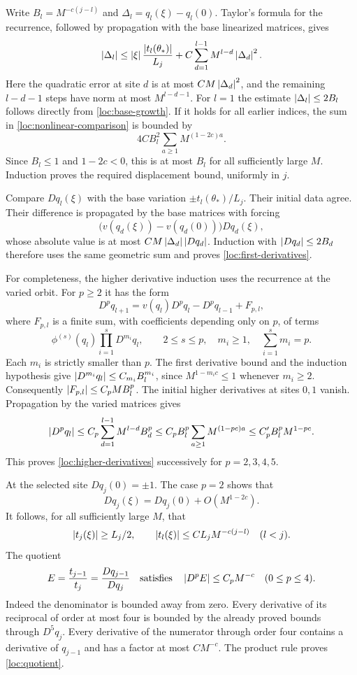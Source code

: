 Write $B_l=M^{-c(j-l)}$ and $\Delta_l=q_l(\xi)-q_l(0)$.
Taylor's formula for the recurrence, followed by propagation with the
base linearized matrices, gives
\begin{equation}
 \left\lvert\Delta_l\right\rvert
 \le \left\lvert\xi\right\rvert\frac{\left\lvert t_l(\theta_*)\right\rvert}{L_j}
       +C\sum_{d=1}^{l-1}M^{l-d}\left\lvert\Delta_d\right\rvert^2.
 \label{loc:nonlinear-comparison}
\end{equation}
Here the quadratic error at site $d$ is at most $CM\left\lvert\Delta_d\right\rvert^2$,
and the remaining $l-d-1$ steps have norm at most $M^{l-d-1}$.
For $l=1$ the estimate $\left\lvert\Delta_l\right\rvert\le2B_l$ follows directly
from \cref{loc:base-growth}. If it holds for all earlier indices,
the sum in \cref{loc:nonlinear-comparison} is bounded by
\[
 4C B_l^2\sum_{a\ge1}M^{(1-2c)a}.
\]
Since $B_l\le1$ and $1-2c<0$, this is at most $B_l$ for all
sufficiently large $M$. Induction proves the required displacement
bound, uniformly in $j$.

Compare $Dq_l(\xi)$ with the base variation
$\pm t_l(\theta_*)/L_j$. Their initial data agree. Their difference
is propagated by the base matrices with forcing
\[
 \bigl(v(q_d(\xi))-v(q_d(0))\bigr)Dq_d(\xi),
\]
whose absolute value is at most $CM\left\lvert\Delta_d\right\rvert\left\lvert Dq_d\right\rvert$.
Induction with $\left\lvert Dq_d\right\rvert\le2B_d$ therefore uses the same geometric
sum and proves \cref{loc:first-derivatives}.

For completeness, the higher derivative induction uses the recurrence
at the varied orbit. For $p\ge2$ it has the form
\[
 D^p q_{l+1}=v(q_l)D^p q_l-D^p q_{l-1}+F_{p,l},
\]
where $F_{p,l}$ is a finite sum, with coefficients depending only on
$p$, of terms
\[
 \phi^{(s)}(q_l)\prod_{i=1}^{s}D^{m_i}q_l,
 \qquad 2\le s\le p,\quad m_i\ge1,\quad
 \sum_{i=1}^{s}m_i=p.
\]
Each $m_i$ is strictly smaller than $p$. The first derivative bound
and the induction hypothesis give
$\left\lvert D^{m_i}q_l\right\rvert\le C_{m_i}B_l^{m_i}$, since
$M^{1-m_ic}\le1$ whenever $m_i\ge2$. Consequently
$\left\lvert F_{p,l}\right\rvert\le C_p M B_l^p$. The initial higher derivatives
at sites $0,1$ vanish. Propagation by the varied matrices gives
\[
 \left\lvert D^p q_l\right\rvert
 \le C_p\sum_{d=1}^{l-1}M^{l-d}B_d^p
 \le C_p B_l^p\sum_{a\ge1}M^{(1-pc)a}
 \le C'_p B_l^p M^{1-pc}.
\]
This proves \cref{loc:higher-derivatives} successively for
$p=2,3,4,5$.

At the selected site $Dq_j(0)=\pm1$. The case $p=2$ shows that
\[
 Dq_j(\xi)=Dq_j(0)+O(M^{1-2c}).
\]
It follows, for all sufficiently large $M$, that
\begin{equation}
 \left\lvert t_j(\xi)\right\rvert\ge L_j/2,\qquad
 \left\lvert t_l(\xi)\right\rvert\le C L_j M^{-c(j-l)}\quad(l<j).
 \label{loc:varied-t}
\end{equation}
The quotient
\begin{equation}
 E=\frac{t_{j-1}}{t_j}=\frac{Dq_{j-1}}{Dq_j}
 \quad\hbox{satisfies}\quad
 \left\lvert D^p E\right\rvert\le C_p M^{-c}\quad(0\le p\le4).
 \label{loc:quotient}
\end{equation}
Indeed the denominator is bounded away from zero. Every derivative of
its reciprocal of order at most four is bounded by the already proved
bounds through $D^5q_j$. Every derivative of the numerator through
order four contains a derivative of $q_{j-1}$ and has a factor at most
$CM^{-c}$. The product rule proves \cref{loc:quotient}.

